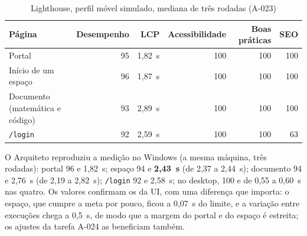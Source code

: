 \begin{table}[htbp]
\centering
\small
\caption{Lighthouse, perfil móvel simulado, mediana de três rodadas (A-023)}\label{tab:lighthouse-movel}
\begin{tabular}{@{}lrrrrr@{}}
\toprule
\textbf{Página} & \textbf{Desempenho} & \textbf{LCP} & \textbf{Acessibilidade} & \textbf{Boas práticas} & \textbf{SEO}\\
\midrule
Portal & 95 & 1,82~s & 100 & 100 & 100\\
Início de um espaço & 96 & 1,87~s & 100 & 100 & 100\\
Documento (matemática e código) & 93 & 2,89~s & 100 & 100 & 100\\
\texttt{/login} & 92 & 2,59~s & 100 & 100 & 63\\
\bottomrule
\end{tabular}
\end{table}
O Arquiteto reproduziu a medição no Windows (a mesma máquina, três rodadas): portal 96 e 1,82~s; espaço 94 e \textbf{2,43~s} (de 2,37 a 2,44~s); documento 94 e 2,76~s (de 2,19 a 2,82~s); \texttt{/login} 92 e 2,58~s; no desktop, 100 e de 0,55 a 0,60~s nas quatro. Os valores confirmam os da UI, com uma diferença que importa: o espaço, que cumpre a meta por pouco, ficou a 0,07~s do limite, e a variação entre execuções chega a 0,5~s, de modo que a margem do portal e do espaço é estreita; os ajustes da tarefa A-024 as beneficiam também.


